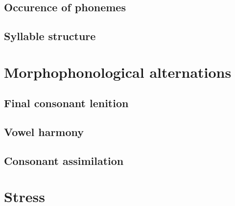\section{Occurence of phonemes}

\section{Syllable structure}

\chapter{Morphophonological alternations}

\section{Final consonant lenition}

\section{Vowel harmony}

\section{Consonant assimilation}

\chapter{Stress}

